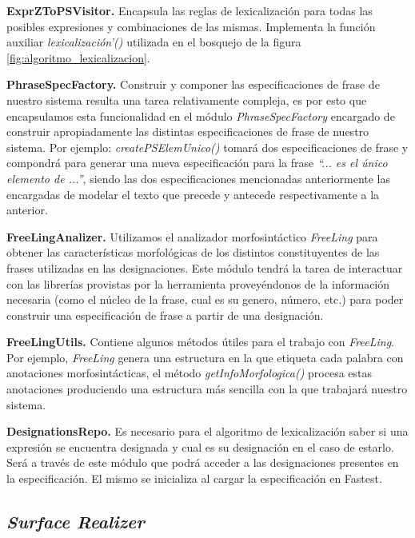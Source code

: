 \bigskip
\noindent
\textbf{ExprZToPSVisitor.} Encapsula las reglas de lexicalización para todas las posibles expresiones y combinaciones de las mismas. Implementa la función auxiliar \textit{lexicalización'()} utilizada en el bosquejo de la figura \ref{fig:algoritmo_lexicalizacion}.

\bigskip
\noindent
\textbf{PhraseSpecFactory.} Construir y componer las especificaciones de frase de nuestro sistema resulta una tarea relativamente compleja, es por esto que encapsulamos esta funcionalidad en el módulo \textit{PhraseSpecFactory} encargado de construir apropiadamente las distintas especificaciones de frase de nuestro sistema. Por ejemplo: \textit{createPSElemUnico()} tomará dos especificaciones de frase y compondrá para generar una nueva especificación para la frase \textit{``... es el único elemento de ...''}, siendo las dos especificaciones mencionadas anteriormente las encargadas de modelar el texto que precede y antecede respectivamente a la anterior.

\bigskip
\noindent
\textbf{FreeLingAnalizer.} Utilizamos el analizador morfosintáctico \textit{FreeLing} para obtener las características morfológicas de los distintos constituyentes de las frases utilizadas en las designaciones. Este módulo tendrá la tarea de interactuar con las librerías provistas por la herramienta proveyéndonos de la información necesaria (como el núcleo de la frase, cual es su genero, número, etc.) para poder construir una especificación de frase a partir de una designación.

\bigskip
\noindent
\textbf{FreeLingUtils.} Contiene algunos métodos útiles para el trabajo con \textit{FreeLing}. Por ejemplo, \textit{FreeLing} genera una estructura en la que etiqueta cada palabra con anotaciones morfosintácticas, el método \textit{getInfoMorfologica()} procesa estas anotaciones produciendo una estructura más sencilla con la que trabajará nuestro sistema.

\bigskip
\noindent
\textbf{DesignationsRepo.} Es necesario para el algoritmo de lexicalización saber si una expresión se encuentra designada y cual es su designación en el caso de estarlo. Será a través de este módulo que podrá acceder a las designaciones presentes en la especificación. El mismo se inicializa al cargar la especificación en Fastest. 

\subsection{\textit{Surface Realizer}}

